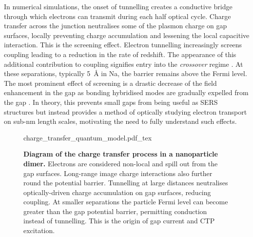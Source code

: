 \documentclass{article}
\begin{document}
In numerical simulations, the onset of tunnelling creates a conductive bridge through which electrons can transmit during each half optical cycle. Charge transfer across the junction neutralises some of the plasmon charge on gap surfaces, locally preventing charge accumulation and lessening the local capacitive interaction. This is the screening effect. Electron tunnelling increasingly screens coupling leading to a reduction in the rate of redshift. The appearance of this additional contribution to coupling signifies entry into the \emph{crossover} regime \cite{zuloaga2009}. At these separations, typically \SI{5}{\angstrom} in Na, the barrier remains above the Fermi level. The most prominent effect of screening is a drastic decrease of the field enhancement in the gap as bonding hybridised modes are gradually expelled from the gap \cite{zuloaga2009, esteban2012}. In theory, this prevents small gaps from being useful as SERS structures but instead provides a method of optically studying electron transport on sub-nm length scales, motivating the need to fully understand such effects.

\begin{figure}[bt]
\vspace{-5pt}
\def\svgwidth{0.9\textwidth}
\fontsize{10pt}{1em}\selectfont
{charge_transfer_quantum_model.pdf_tex}
\caption[Diagram of the charge transfer process in a nanoparticle dimer]{\textbf{Diagram of the charge transfer process in a nanoparticle dimer.} Electrons are considered non-local and spill out from the gap surfaces. Long-range image charge interactions also further round the potential barrier. Tunnelling at large distances neutralises optically-driven charge accumulation on gap surfaces, reducing coupling. At smaller separations the particle Fermi level can become greater than the gap potential barrier, permitting conduction instead of tunnelling. This is the origin of gap current and CTP excitation.}
\label{fig:quantum_charge_transfer_model}
\vspace{-15pt}
\end{figure}
\end{document}

